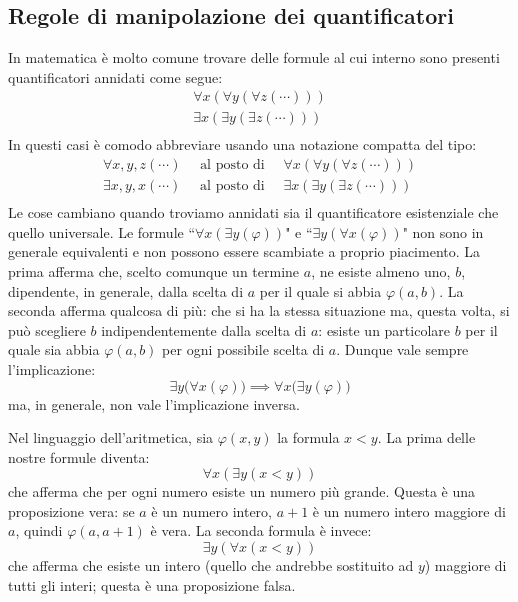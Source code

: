 \subsection{Regole di manipolazione dei quantificatori}
In matematica è molto comune trovare delle formule al cui interno sono presenti quantificatori annidati come segue:
\[
\begin{array}{lc}
	\forall x ( \forall y (\forall z ( \cdots ) ) ) \\
	\exists x ( \exists y (\exists z (\cdots )))\\
\end{array}
\]
In questi casi è comodo abbreviare usando una notazione compatta del tipo:
\[
\begin{array}{lc}
	\forall x,y,z ( \cdots ) \quad \mbox{ al posto di } \quad \forall x ( \forall y (\forall z ( \cdots ) ) ) \\
	\exists x,y,x (\cdots ) \quad \mbox { al posto di } \quad \exists x ( \exists y (\exists z (\cdots )))\\
\end{array}
\]
Le cose cambiano quando troviamo annidati sia il quantificatore esistenziale che quello universale. Le formule ``$\forall x (\exists y (\varphi))$" e ``$\exists y (\forall x (\varphi))$" non sono in generale equivalenti e non possono essere scambiate a proprio piacimento. La prima afferma che, scelto comunque un termine $a$, ne esiste almeno uno, $b$, dipendente, in generale, dalla scelta di $a$ per il quale si abbia $\varphi(a,b)$. La seconda afferma qualcosa di più: che si ha la stessa situazione ma, questa volta, si può scegliere $b$ indipendentemente dalla scelta di $a$: esiste un particolare $b$ per il quale sia abbia $\varphi(a,b)$ per ogni possibile scelta di $a$. Dunque vale sempre l'implicazione:
\begin{displaymath}
	\exists y \bigl( \forall x (\varphi) \bigr) \implies \forall x \bigl( \exists y (\varphi)\bigr)
\end{displaymath}
ma, in generale, non vale l'implicazione inversa.

\begin{example}
	Nel linguaggio dell'aritmetica, sia $\varphi(x,y)$ la formula $x<y$. La prima delle nostre formule diventa:
	\begin{displaymath}
		\forall x (\exists y (x<y))
	\end{displaymath}
	che afferma che per ogni numero esiste un numero più grande. Questa è una proposizione vera: se $a$ è un numero intero, $a+1$ è un numero intero maggiore di $a$, quindi $\varphi(a,a+1)$ è vera. La seconda formula è invece:
	\begin{displaymath}
		\exists y (\forall x (x < y))
	\end{displaymath}
	che afferma che esiste un intero (quello che andrebbe sostituito ad $y$) maggiore di tutti gli interi; questa è una proposizione falsa.
\end{example}

